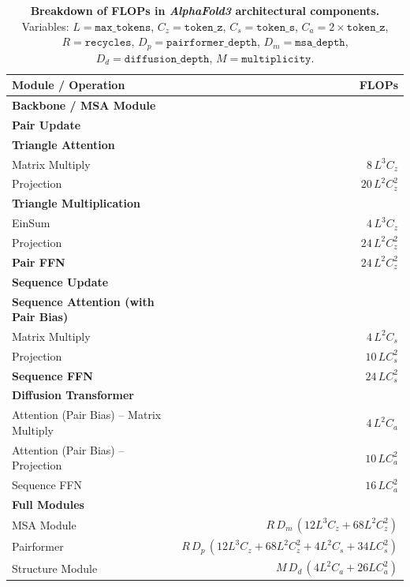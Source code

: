 \documentclass{article} %
\newcommand{\lbltbl}[1]{\label{tbl:#1}}
\def\af{{\textit{AlphaFold3}}\xspace}
\begin{document}
\begin{table}[t]
\centering
\small
\begin{tabular}{@{}l r@{}}
\toprule
\textbf{Module / Operation} & \textbf{FLOPs} \\
\midrule
\textbf{Backbone / MSA Module} & \\
\quad \textbf{Pair Update} & \\
\quad\quad \textbf{Triangle Attention} & \\
\quad\quad\quad Matrix Multiply & $8\,L^{3}C_z$ \\
\quad\quad\quad Projection & $20\,L^2C_z^{2}$ \\
\quad\quad \textbf{Triangle Multiplication} & \\
\quad\quad\quad EinSum & $4\,L^{3}C_z$ \\
\quad\quad\quad Projection & $24\,L^2 C_z^{2}$ \\
\quad\quad \textbf{Pair FFN} & $24\,L^2 C_z^{2}$ \\[3pt]
\quad \textbf{Sequence Update} & \\
\quad\quad \textbf{Sequence Attention (with Pair Bias)} & \\
\quad\quad\quad Matrix Multiply & $4\,L^2C_s$ \\
\quad\quad\quad Projection & $10\,LC_s^{2}$ \\
\quad\quad \textbf{Sequence FFN} & $24\,LC_s^{2}$ \\
\midrule
\textbf{Diffusion Transformer} & \\
\quad Attention (Pair Bias) – Matrix Multiply & $4\,L^2C_a$ \\
\quad Attention (Pair Bias) – Projection & $10\,LC_a^{2}$ \\
\quad Sequence FFN & $16\,LC_a^{2}$ \\
\midrule
\textbf{Full Modules} & \\
\quad MSA Module & $R \,D_m \,(12 L^3 C_z + 68 L^2 C_z^2)$ \\
\quad Pairformer & $R \,D_p \,(12 L^3 C_z + 68 L^2 C_z^2 + 4 L^2 C_s + 34 L C_s^2)$ \\
\quad Structure Module & $M \,D_d \,(4 L^2 C_a + 26 L C_a^2)$ \\
\bottomrule
\end{tabular}
\caption{
\textbf{Breakdown of FLOPs in \af architectural components.}
Variables: $L=\texttt{max\_tokens}$, $C_z=\texttt{token\_z}$, 
$C_s=\texttt{token\_s}$, $C_a=2\times\texttt{token\_z}$, 
$R=\texttt{recycles}$, $D_p=\texttt{pairformer\_depth}$, 
$D_m=\texttt{msa\_depth}$, $D_d=\texttt{diffusion\_depth}$, 
$M=\texttt{multiplicity}$.
}
\lbltbl{flops}
\end{table}
\end{document}
